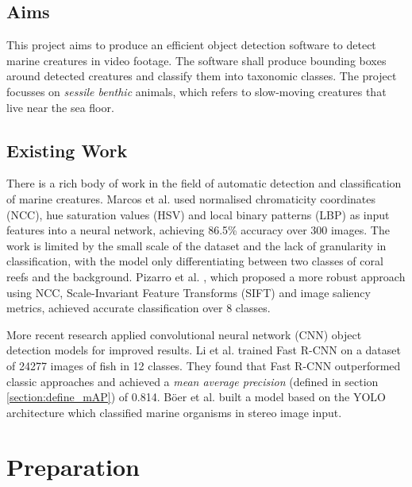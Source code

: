 \documentclass[12pt,a4paper,twoside,openany]{report}
\begin{document}
\section{Aims}
This project aims to produce an efficient object detection software to detect marine creatures in video footage. The software shall produce bounding boxes around detected creatures and classify them into taxonomic classes. The project focusses on \textit{sessile benthic} animals, which refers to slow-moving creatures that live near the sea floor. 

\section{Existing Work}
There is a rich body of work in the field of automatic detection and classification of marine creatures. Marcos et al. \cite{marcos_classification_2005} used normalised chromaticity coordinates (NCC), hue saturation values (HSV) and local binary patterns (LBP) as input features into a neural network, achieving 86.5\% accuracy over 300 images. The work is limited by the small scale of the dataset and the lack of granularity in classification, with the model only differentiating between two classes of coral reefs and the background. Pizarro et al. \cite{pizarro_towards_2008}, which proposed a more robust approach using NCC, Scale-Invariant Feature Transforms (SIFT) and image saliency metrics, achieved accurate classification over 8 classes.

More recent research applied convolutional neural network (CNN) object detection models for improved results. Li et al. \cite{li_fast_2015} trained Fast R-CNN \cite{girshick_fast_2015} on a dataset of 24277 images of fish in 12 classes. They found that Fast R-CNN outperformed classic approaches and achieved a \textit{mean average precision} (defined in section \ref{section:define_mAP}) of 0.814. Böer et al. \cite{boer_deep-learning_2023} built a model based on the YOLO \cite{redmon_you_2016} architecture which classified marine organisms in stereo image input. 

\chapter{Preparation}
\end{document}
